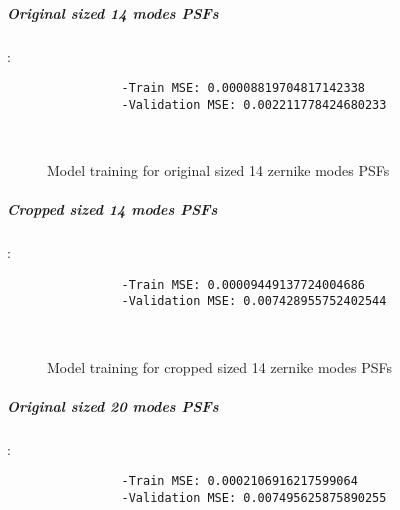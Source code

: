 		\subparagraph{Original sized 14 modes PSFs}:\\
		\begin{lstlisting}	
        		-Train MSE: 0.00008819704817142338
        		-Validation MSE: 0.002211778424680233
		\end{lstlisting}
		
		\begin{figure*}[ht!]
			\hspace{\fill}
			\hspace{\fill}
			\\
			\caption{Model training for original sized 14 zernike modes PSFs}
		\end{figure*}
		\FloatBarrier
		
		\subparagraph{Cropped sized 14 modes PSFs}:\\
		\begin{lstlisting}	
        		-Train MSE: 0.00009449137724004686
        		-Validation MSE: 0.007428955752402544
		\end{lstlisting}
		
		\begin{figure*}[ht!]
			\hspace{\fill}
			\hspace{\fill}
			\\
			\caption{Model training for cropped sized 14 zernike modes PSFs}
		\end{figure*}
		\FloatBarrier
		
		\subparagraph{Original sized 20 modes PSFs}:\\
		\begin{lstlisting}	
        		-Train MSE: 0.0002106916217599064
        		-Validation MSE: 0.007495625875890255
		\end{lstlisting}
		
